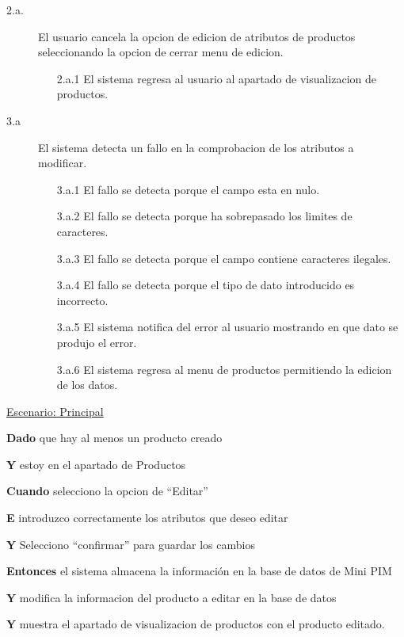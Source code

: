 \begin{description}
    \item[2.a.] El usuario cancela la opcion de edicion de atributos de productos seleccionando la opcion de cerrar menu de edicion.
    \begin{enumerate}
        \item[2.a.1] El sistema regresa al usuario al apartado de visualizacion de productos.
    \end{enumerate}

    \item[3.a] El sistema detecta un fallo en la comprobacion de los atributos a modificar.
    \begin{enumerate}
        \item[3.a.1] El fallo se detecta porque el campo esta en nulo.
        \item[3.a.2] El fallo se detecta porque ha sobrepasado los limites de caracteres.
        \item[3.a.3] El fallo se detecta porque el campo contiene caracteres ilegales.
        \item[3.a.4] El fallo se detecta porque el tipo de dato introducido es incorrecto.
        \item[3.a.5] El sistema notifica del error al usuario mostrando en que dato se produjo el error.
        \item[3.a.6] El sistema regresa al menu de productos permitiendo la edicion de los datos.
    \end{enumerate}
\end{description}

\underline{Escenario: Principal}\par
\vspace{0.15cm}
\textbf{Dado} que hay al menos un producto creado\par
\textbf{Y} estoy en el apartado de Productos\par
\textbf{Cuando} selecciono la opcion de “Editar”\par
\textbf{E} introduzco correctamente los atributos que deseo editar\par
\textbf{Y} Selecciono “confirmar” para guardar los cambios\par
\textbf{Entonces} el sistema almacena la información en la base de datos de Mini PIM\par
\textbf{Y} modifica la informacion del producto a editar en la base de datos\par
\textbf{Y} muestra el apartado de visualizacion de productos con el producto editado.\par
\vspace{0.20cm}

